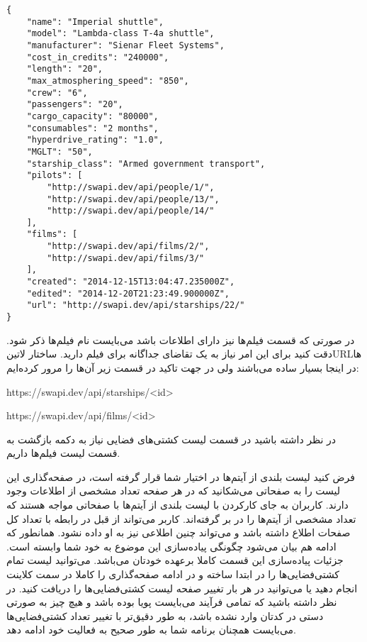 \documentclass[../main.tex]{subfiles}
\begin{document}
\begin{latin}
\begin{verbatim}
{
    "name": "Imperial shuttle",
    "model": "Lambda-class T-4a shuttle",
    "manufacturer": "Sienar Fleet Systems",
    "cost_in_credits": "240000",
    "length": "20",
    "max_atmosphering_speed": "850",
    "crew": "6",
    "passengers": "20",
    "cargo_capacity": "80000",
    "consumables": "2 months",
    "hyperdrive_rating": "1.0",
    "MGLT": "50",
    "starship_class": "Armed government transport",
    "pilots": [
        "http://swapi.dev/api/people/1/",
        "http://swapi.dev/api/people/13/",
        "http://swapi.dev/api/people/14/"
    ],
    "films": [
        "http://swapi.dev/api/films/2/",
        "http://swapi.dev/api/films/3/"
    ],
    "created": "2014-12-15T13:04:47.235000Z",
    "edited": "2014-12-20T21:23:49.900000Z",
    "url": "http://swapi.dev/api/starships/22/"
}
\end{verbatim}
\end{latin}

در صورتی که قسمت فیلم‌ها نیز دارای اطلاعات باشد می‌بایست نام فیلم‌ها ذکر شود.
دقت کنید برای این امر نیاز به یک تقاضای جداگانه برای فیلم دارید. ساختار ‌لاتین{URL}ها در اینجا بسیار ساده می‌باشند ولی در جهت تاکید در قسمت زیر آن‌ها را مرور کرده‌ایم:

\begin{itemize}\begin{latinitems}
  \item https://swapi.dev/api/starships/<id>
  \item https://swapi.dev/api/films/<id>
\end{latinitems}\end{itemize}

در نظر داشته باشید در قسمت لیست کشتی‌های فضایی نیاز به دکمه بازگشت به قسمت لیست فیلم‌ها داریم.


فرض کنید لیست بلندی از آیتم‌ها در اختیار شما قرار گرفته است، در صفحه‌گذاری این لیست را به صفحاتی می‌شکانید که در هر صفحه تعداد مشخصی از اطلاعات وجود دارند. کاربران به جای کارکردن با لیست بلندی از آیتم‌ها با صفحاتی مواجه هستند که تعداد مشخصی از آیتم‌ها را در بر گرفته‌اند. کاربر می‌تواند از قبل در رابطه با تعداد کل صفحات اطلاع داشته باشد و می‌تواند چنین اطلاعی نیز به او داده نشود. همانطور که ادامه هم بیان می‌شود چگونگی پیاده‌سازی این موضوع به خود شما وابسته است.
جزئیات پیاده‌سازی این قسمت کاملا برعهده خودتان می‌باشد.
می‌توانید لیست تمام کشتی‌فضایی‌ها را در ابتدا ساخته و در ادامه صفحه‌گذاری را کاملا در سمت کلاینت انجام دهید یا می‌توانید در هر بار تغییر صفحه لیست کشتی‌فضایی‌ها را دریافت کنید.
در نظر داشته باشید که تمامی فرآیند می‌بایست پویا بوده باشد و هیچ چیز به صورتی دستی در کدتان وارد نشده باشد، به طور دقیق‌تر با تغییر تعداد کشتی‌فضایی‌ها می‌بایست همچنان برنامه شما به طور صحیح به فعالیت خود ادامه دهد.
\end{document}
